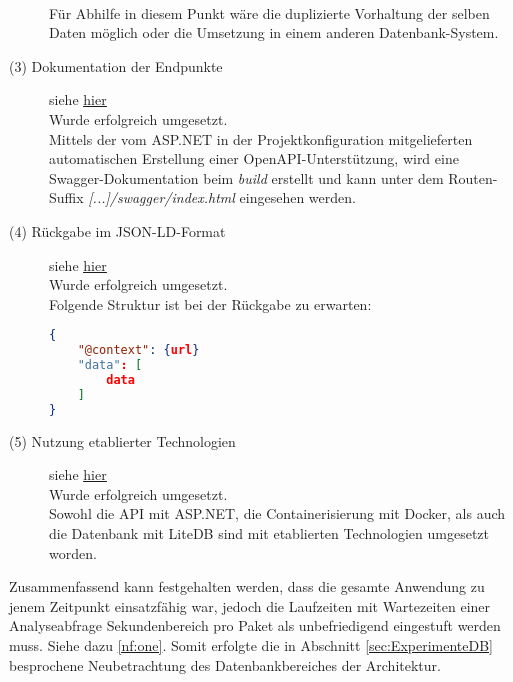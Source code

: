 \begin{description}
            \\
            Für Abhilfe in diesem Punkt wäre die duplizierte Vorhaltung der selben Daten möglich oder die Umsetzung in einem anderen Datenbank-System.
        \item[(3) Dokumentation der Endpunkte] siehe \hyperref[nf:three]{\underline{hier}} \hfill \\
            Wurde erfolgreich umgesetzt.
            \\
            Mittels der vom ASP.NET in der Projektkonfiguration mitgelieferten automatischen Erstellung einer OpenAPI-Unterstützung, wird eine Swagger-Dokumentation beim \textit{build} erstellt und kann unter dem Routen-Suffix \textit{[...]/swagger/index.html} eingesehen werden.
        \item[(4) Rückgabe im \acs{JSON-LD}-Format] siehe \hyperref[nf:four]{\underline{hier}} \hfill \\
            Wurde erfolgreich umgesetzt.
            \\
            Folgende Struktur ist bei der Rückgabe zu erwarten:
            \begin{lstlisting}[language=json,firstnumber=1]
{
    "@context": {url}
    "data": [
        data
    ]
}
            \end{lstlisting}
        \item[(5) Nutzung etablierter Technologien] siehe \hyperref[nf:five]{\underline{hier}} \hfill \\
            Wurde erfolgreich umgesetzt.
            \\
            Sowohl die \ac{API} mit ASP.NET, die Containerisierung mit Docker, als auch die Datenbank mit LiteDB sind mit etablierten Technologien umgesetzt worden.
    \end{description}

    \noindent Zusammenfassend kann festgehalten werden, dass die gesamte Anwendung zu jenem Zeitpunkt einsatzfähig war, jedoch die Laufzeiten mit Wartezeiten einer Analyseabfrage Sekundenbereich pro Paket als unbefriedigend eingestuft werden muss. Siehe dazu \ref{nf:one}.
    Somit erfolgte die in Abschnitt \ref{sec:ExperimenteDB}  besprochene Neubetrachtung des Datenbankbereiches der Architektur.

